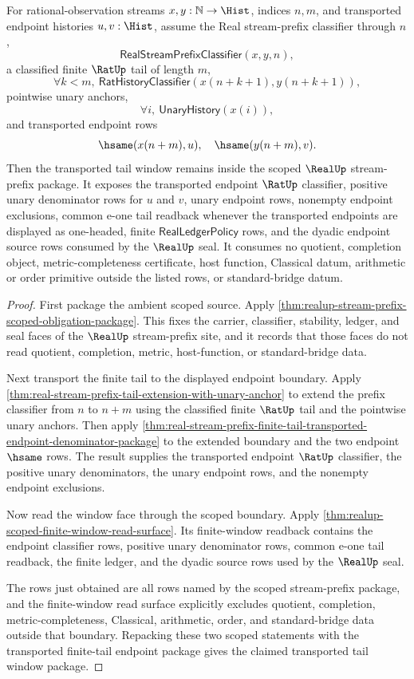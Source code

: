 \begin{theorem}
\label{thm:realup-scoped-window-tail-transport-package}
For rational-observation streams $x,y:\mathbb{N}\to\Hist$, indices $n,m$, and
transported endpoint histories $u,v:\Hist$, assume the Real stream-prefix
classifier through $n$,
$$
\mathsf{RealStreamPrefixClassifier}(x,y,n),
$$
a classified finite $\RatUp$ tail of length $m$,
$$
\forall k<m,\ \mathsf{RatHistoryClassifier}(x(n+k+1),y(n+k+1)),
$$
pointwise unary anchors,
$$
\forall i,\ \mathsf{UnaryHistory}(x(i)),
$$
and transported endpoint rows
$$
\hsame(x(n+m),u),\quad \hsame(y(n+m),v).
$$
Then the transported tail window remains inside the scoped $\RealUp$
stream-prefix package. It exposes the transported endpoint $\RatUp$ classifier,
positive unary denominator rows for $u$ and $v$, unary endpoint rows, nonempty
endpoint exclusions, common e-one tail readback whenever the transported
endpoints are displayed as one-headed, finite $\mathsf{RealLedgerPolicy}$ rows,
and the dyadic endpoint source rows consumed by the $\RealUp$ seal. It consumes
no quotient, completion object, metric-completeness certificate, host function,
Classical datum, arithmetic or order primitive outside the listed rows, or
standard-bridge datum.
\end{theorem}
\begin{proof}
First package the ambient scoped source. Apply
\autoref{thm:realup-stream-prefix-scoped-obligation-package}. This fixes the
carrier, classifier, stability, ledger, and seal faces of the $\RealUp$
stream-prefix site, and it records that those faces do not read quotient,
completion, metric, host-function, or standard-bridge data.

Next transport the finite tail to the displayed endpoint boundary. Apply
\autoref{thm:real-stream-prefix-tail-extension-with-unary-anchor} to extend the
prefix classifier from $n$ to $n+m$ using the classified finite $\RatUp$ tail and
the pointwise unary anchors. Then apply
\autoref{thm:real-stream-prefix-finite-tail-transported-endpoint-denominator-package}
to the extended boundary and the two endpoint $\hsame$ rows. The result supplies
the transported endpoint $\RatUp$ classifier, the positive unary denominators,
the unary endpoint rows, and the nonempty endpoint exclusions.

Now read the window face through the scoped boundary. Apply
\autoref{thm:realup-scoped-finite-window-read-surface}. Its finite-window
readback contains the endpoint classifier rows, positive unary denominator rows,
common e-one tail readback, the finite ledger, and the dyadic source rows used by
the $\RealUp$ seal.

The rows just obtained are all rows named by the scoped stream-prefix package,
and the finite-window read surface explicitly excludes quotient, completion,
metric-completeness, Classical, arithmetic, order, and standard-bridge data
outside that boundary. Repacking these two scoped statements with the
transported finite-tail endpoint package gives the claimed transported tail
window package.
\end{proof}

